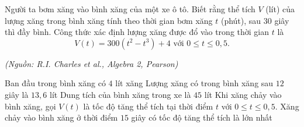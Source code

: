 \begin{ex}%
	Người ta bơm xăng vào bình xăng của một xe ô tô. Biết rằng thể tích $V$ (lít) của lượng xăng trong bình xăng tính theo thời gian bơm xăng $t$ (phút), sau $30$ giây thì đầy bình. Công thức xác định lượng xăng được đổ vào trong thời gian $t$ là $$V(t)=300(t^2-t^3)+4 \text{ với } 0\le t\le 0{,}5.$$
	\begin{flushright}
		\textit{(Nguồn: R.I. Charles et al., Algebra 2, Pearson)}
	\end{flushright}
	\choiceTF
	{\True Ban đầu trong bình xăng có $4$ lít xăng}
	{\True Lượng xăng có trong bình xăng sau $12$ giây là $13{,}6$ lít}
	{Dung tích của bình xăng trong xe là $45$ lít}
	{Khi xăng chảy vào bình xăng, gọi $V(t)$ là tốc độ tăng thể tích tại thời điểm $t$ với $0\le t\le 0{,}5$. Xăng chảy vào bình xăng ở thời điểm $15$ giây có tốc độ tăng thể tích là lớn nhất}
\end{ex}

